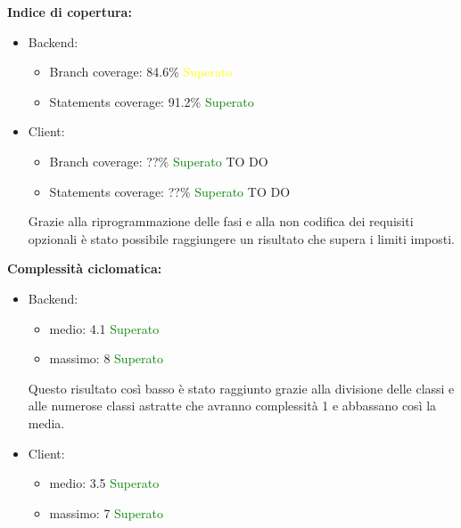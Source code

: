 			\begin{description}
				\item \textbf{Indice di copertura:}				
				\begin{itemize}
						\item Backend:
							\begin{itemize}
								\item Branch coverage: 84.6\% \textcolor{yellow}{Superato}
								\item Statements coverage: 91.2\% \textcolor{green}{Superato}
							\end{itemize}
						\item Client:
							\begin{itemize}
								\item Branch coverage: ??\% \textcolor{green}{Superato} TO DO
								\item Statements coverage: ??\% \textcolor{green}{Superato} TO DO
							\end{itemize}
						Grazie alla riprogrammazione delle fasi e alla non codifica dei requisiti opzionali è stato possibile raggiungere un risultato che supera i limiti imposti.
					\end{itemize}
				
				\item \textbf{Complessità ciclomatica:}
					\begin{itemize}
						\item Backend:
							\begin{itemize}
								\item medio: 4.1 \textcolor{green}{Superato}
								\item massimo: 8 \textcolor{green}{Superato}
							\end{itemize}
						Questo risultato così basso è stato raggiunto grazie alla divisione delle classi e alle numerose classi astratte che avranno complessità 1 e abbassano così la media.
						\item Client:
							\begin{itemize}
								\item medio: 3.5 \textcolor{green}{Superato}
								\item massimo: 7 \textcolor{green}{Superato}
							\end{itemize}
					\end{itemize}
						

\end{description}
